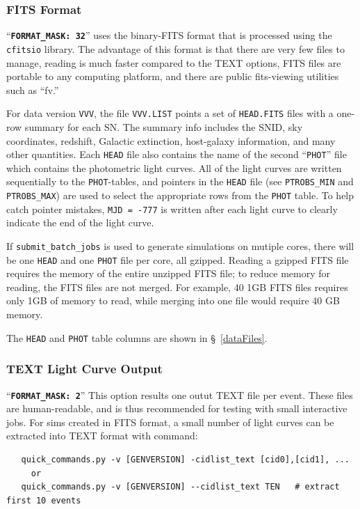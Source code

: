 \documentclass[12pt]{article}
\begin{document}
   \subsubsection{FITS Format}
   \label{sss:fits_format}
``{\tt\bf FORMAT\_MASK:  32}'' 
uses the binary-FITS format that is processed using the 
{\tt cfitsio} library. 
The advantage of this format is that there are very few files
to manage, reading is much faster compared to the TEXT options, 
FITS files are portable to any computing platform,
and there are public fits-viewing utilities such as ``fv.''

For data version {\tt VVV}, the file {\tt VVV.LIST} points 
a set of {\tt HEAD.FITS} files with a one-row summary for each SN.
The summary info includes the SNID, sky coordinates, redshift,
Galactic extinction, host-galaxy information, and many other quantities.
Each {\tt HEAD} file also contains the name of the second 
``{\tt PHOT}'' file which contains the photometric light curves.
All of the light curves are written sequentially to the
{\tt PHOT}-tables, and pointers in the {\tt HEAD} file 
(see {\tt PTROBS\_MIN} and {\tt PTROBS\_MAX}) 
are used to select the appropriate rows from the {\tt PHOT} table.
To help catch pointer mistakes, {\tt MJD = -777} is written
after each light curve to clearly indicate the end of the light curve.


If {\tt submit\_batch\_jobs} is used to generate simulations on mutiple cores,
there will be one {\tt HEAD} and one {\tt PHOT} file per core, all gzipped. 
Reading a gzipped FITS file requires the memory of the entire unzipped FITS
file; to reduce memory for reading, the FITS files are not merged.
For example, 40 1GB FITS files requires only 1GB of memory to read,
while merging into one file would require 40 GB memory.

The {\tt HEAD} and {\tt PHOT} table columns are shown in \S~\ref{dataFiles}.


   \subsubsection{TEXT Light Curve Output }
   \label{sss:text_format}

``{\tt\bf FORMAT\_MASK:  2}'' 
This  option results one outut TEXT file per event.
These files are human-readable, and is thus recommended for testing with small interactive jobs.
For sims created in FITS format, a small number of light curves can be extracted
into TEXT format with command:
\begin{verbatim}
   quick_commands.py -v [GENVERSION] -cidlist_text [cid0],[cid1], ...
     or
   quick_commands.py -v [GENVERSION] --cidlist_text TEN   # extract first 10 events
\end{verbatim}
\end{document}
